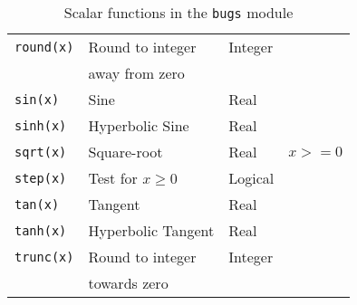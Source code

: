 \documentclass[11pt, a4paper, titlepage]{report}
\begin{document}
\begin{table}
\begin{center}
\begin{tabular}{llll}
\verb+round(x)+     & Round to integer    & Integer & \\
                    & away from zero      &      & \\
\verb+sin(x)+       & Sine                & Real & \\
\verb+sinh(x)+      & Hyperbolic Sine     & Real & \\
\verb+sqrt(x)+      & Square-root         & Real & $x >= 0$ \\
\verb+step(x)+      & Test for $x \geq 0$ & Logical & \\
\verb+tan(x)+       & Tangent             & Real & \\
\verb+tanh(x)+      & Hyperbolic Tangent  & Real & \\
\verb+trunc(x)+     & Round to integer    & Integer & \\
                    & towards zero        & \\
\hline
\end{tabular}
\caption{Scalar functions in the \texttt{bugs} module \label{table:bugs:scalar}}
\end{center}
\end{table}
\end{document}
